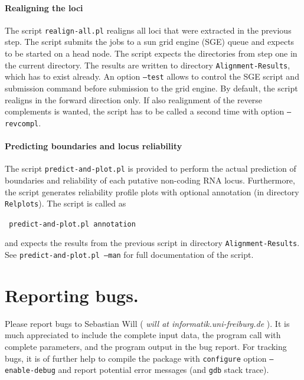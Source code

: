 \documentclass{article}
\newenvironment{ttbox}{%
  \begin{framed}\begin{minipage}{1.0\textwidth}\tt}%
{\end{minipage}\end{framed}}
\begin{document}
\paragraph{Realigning the loci} The script \texttt{realign-all.pl}
realigns all loci that were extracted in the previous step. The script
submits the jobs to a sun grid engine (SGE) queue and expects to be
started on a head node. The script expects the directories from step
one in the current directory. The results are written to directory
\texttt{Alignment-Results}, which has to exist already. An option
\texttt{--test} allows to control the SGE script and submission
command before submission to the grid engine. By default, the script
realigns in the forward direction only. If also realignment of the
reverse complements is wanted, the script has to be called a second
time with option \texttt{--revcompl}.

\paragraph{Predicting boundaries and locus reliability}
The script \texttt{predict-and-plot.pl} is provided to perform the
actual prediction of boundaries and reliability of each putative
non-coding RNA locus. Furthermore, the script generates reliability
profile plots with optional annotation (in directory
\texttt{Relplots}). The script is called as
\begin{ttbox}
  predict-and-plot.pl annotation
\end{ttbox}
and expects the results from the previous script in directory
\texttt{Alignment-Results}.  See \texttt{predict-and-plot.pl --man}
for full documentation of the script.

\section{Reporting bugs.}

Please report bugs to Sebastian Will ( \emph{will at
  informatik.uni-freiburg.de} ). It is much appreciated to include the
complete input data, the program call with complete parameters, and
the program output in the bug report. For tracking bugs, it is of
further help to compile the package with \texttt{configure} option
\texttt{--enable-debug} and report potential error messages (and
\texttt{gdb} stack trace).



\end{document}
